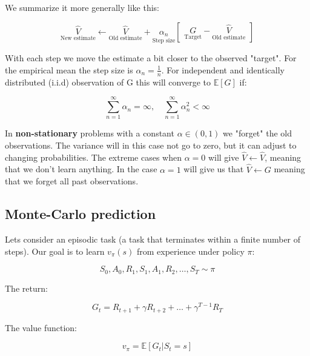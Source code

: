 We summarize it more generally like this:

	\begin{equation}
		\underset{\text{New estimate}}{\hat{V}} \leftarrow \underset{\text{Old estimate}}{\hat{V}}  +\underset{\text{Step size}}{\alpha_n} \begin{bmatrix} \underset{\text{Target}}{G} - \underset{\text{Old estimate}}{\hat{V}} \end{bmatrix} 
	\end{equation}

With each step we move the estimate a bit closer to the observed "target". For the empirical mean the step size is $\alpha_n = \frac{1} {n} $. For independent and identically distributed (i.i.d) observation of G this will converge to $\mathbb{E}[G]$ if:

	\begin{equation}
		\sum_{n=1}^{\infty} \alpha_n = \infty, \quad \sum_{n=1}^{\infty} \alpha_n^{2} < \infty
	\end{equation}


In \textbf{non-stationary} problems with a constant $\alpha \in (0,1)$ we "forget" the old observations. The variance will in this case not go to zero, but it can adjust to changing probabilities. The extreme cases when $\alpha = 0$ will give $\hat{V} \leftarrow \hat{V}$, meaning that we don't learn anything. In the case $\alpha = 1$ will give us that $\hat{V} \leftarrow G$ meaning that we forget all past observations. 

\subsection{Monte-Carlo prediction}
Lets consider an episodic task (a task that terminates within a finite number of steps). Our goal is to learn $v_\pi(s)$ from experience under policy $\pi$:
	
	\begin{equation}
		S_0, A_0, R_1, S_1, A_1, R_2, \ldots, S_T \sim \pi
	\end{equation}

The return: 

	\begin{equation}
		G_t = R_{t+1} + \gamma R_{t+2} + \ldots + \gamma^{T-1}R_T
	\end{equation}

The value function:

	\begin{equation}
		v_\pi = \mathbb{E}[G_t |S_t = s]
	\end{equation}

